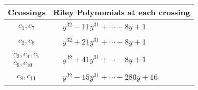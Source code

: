 \documentclass[1p]{elsarticle_modified}
\theoremstyle{definition}
\begin{document}
\begin{tabular}{m{50pt}|m{274pt}}
Crossings & \hspace{64pt}Riley Polynomials at each crossing \\
\hline $$\begin{aligned}c_{1},c_{7}\end{aligned}$$&$\begin{aligned}
&y^{32}-11 y^{31}+\cdots-8 y+1
\end{aligned}$\\
\hline $$\begin{aligned}c_{2},c_{6}\end{aligned}$$&$\begin{aligned}
&y^{32}+21 y^{31}+\cdots-8 y+1
\end{aligned}$\\
\hline $$\begin{aligned}c_{3},c_{4},c_{5}\\c_{9},c_{10}\end{aligned}$$&$\begin{aligned}
&y^{32}+41 y^{31}+\cdots-8 y+1
\end{aligned}$\\
\hline $$\begin{aligned}c_{8},c_{11}\end{aligned}$$&$\begin{aligned}
&y^{32}-15 y^{31}+\cdots-280 y+16
\end{aligned}$\\
\hline
\end{tabular}
\vskip 2pc
\end{document}
